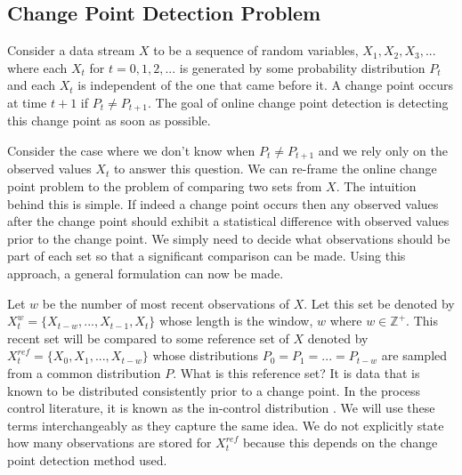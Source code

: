 \subsection{Change Point Detection Problem}
\label{probFormulation}
Consider a data stream $X$ to be a sequence of random variables, $X_1, X_2, X_3,...$ where each $X_t$ for $t=0,1,2,...$ is generated by some probability distribution $P_t$ and each $X_t$ is independent of the one that came before it. A change point occurs at time $t+1$ if $P_t \neq P_{t+1}$. The goal of online change point detection is detecting this change point as soon as possible. 

Consider the case where we don't know when $P_t \neq P_{t+1}$ and we rely only on the observed values $X_t$ to answer this question. We can re-frame the online change point problem to the problem of comparing two sets from $X$. The intuition behind this is simple. If indeed a change point occurs then any observed values after the change point should exhibit a statistical difference with observed values prior to the change point. We simply need to decide what observations should be part of each set so that a significant comparison can be made. Using this approach, a general formulation can now be made.

Let $w$ be the number of most recent observations of $X$. Let this set be denoted by $X_t^w = \{X_{t-w},...,X_{t-1}, X_t\}$ whose length is the window, $w$ where $ w \in \mathbb{Z}^+$. This recent set will be compared to some reference set of $X$ denoted by $X_t^{ref}= \{X_0, X_1, ..., X_{t-w} \}$ whose distributions $P_0 = P_1=...= P_{t-w}$ are sampled from a common distribution $P$. What is this reference set? It is data that is known to be distributed consistently prior to a change point. In the process control literature, it is known as the in-control distribution \cite{bersimis2007multivariate}. We will use these terms interchangeably as they capture the same idea. We do not explicitly state how many observations are stored for $X_t^{ref}$ because this depends on the change point detection method used. 

